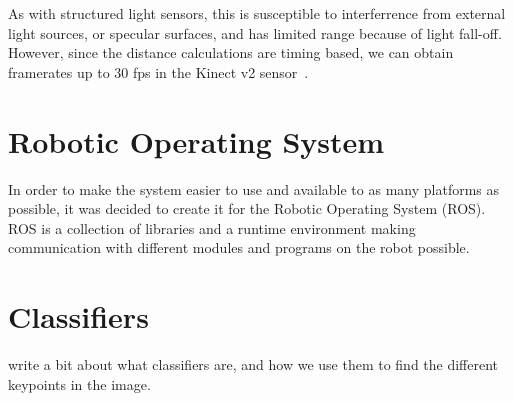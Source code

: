 As with structured light sensors, this is susceptible to interferrence from external light sources, or specular surfaces, and has limited range because of light fall-off. However, since the distance calculations are timing based, we can obtain framerates up to 30 fps in the Kinect v2 sensor~\cite{Lachat_2015}.





\section{Robotic Operating System}

In order to make the system easier to use and available to as many platforms as possible, it was decided to create it for the Robotic Operating System (ROS). ROS is a collection of libraries and a runtime environment making communication with different modules and programs on the robot possible. 

\section{Classifiers}

write a bit about what classifiers are, and how we use them to find the different keypoints in the image. 
